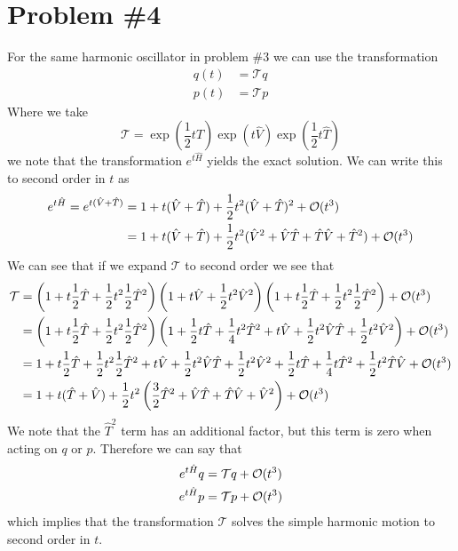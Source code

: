 \documentclass[11pt]{article}
\numberwithin{equation}{section}
\begin{document}
\pagebreak

\section{Problem \#4}
For the same harmonic oscillator in problem \#3 we can use the transformation
\begin{align*}
q(t) &= \mathcal{T}q\\
p(t) &= \mathcal{T}p
\end{align*}
Where we take
$$\mathcal{T} =  \exp\left(\frac{1}{2}t\hat{T}\right) \exp\left(t\hat{V}\right)\exp\left(\frac{1}{2}t\hat{T}\right)$$
we note that the transformation $e^{t\hat{H}}$ yields the exact solution. We can write this 
to second order in $t$ as
\begin{align*}
e^{t\hat{H}} = e^{t(\hat{V}+\hat{T})} &= 1 + t(\hat{V}+\hat{T}) + \frac{1}{2}t^2(\hat{V}+\hat{T})^2 + \mathcal{O}(t^3)\\ 
&= 1 + t(\hat{V}+\hat{T}) + \frac{1}{2}t^2(\hat{V}^2 + \hat{V}\hat{T} + \hat{T}\hat{V} +\hat{T}^2) + \mathcal{O}(t^3)\\ 
\end{align*}
We can see that if we expand $\mathcal{T}$ to second order we see that
\begin{align*}
\mathcal{T} &=  \left(1 + t\frac{1}{2}\hat{T} + \frac{1}{2}t^2\frac{1}{2}\hat{T}^2\right)\left(1 + t\hat{V} + \frac{1}{2}t^2\hat{V}^2\right)\left(1 + t\frac{1}{2}\hat{T} + \frac{1}{2}t^2\frac{1}{2}\hat{T}^2\right) + \mathcal{O}(t^3)\\
&=  \left(1 + t\frac{1}{2}\hat{T} + \frac{1}{2}t^2\frac{1}{2}\hat{T}^2\right)\left(1 + \frac{1}{2}t\hat{T} + \frac{1}{4}t^2\hat{T}^2 + t\hat{V} + \frac{1}{2}t^2\hat{V}\hat{T} + \frac{1}{2}t^2\hat{V}^2\right) + \mathcal{O}(t^3)\\
&=  1 + t\frac{1}{2}\hat{T} + \frac{1}{2}t^2\frac{1}{2}\hat{T}^2 + t\hat{V} + \frac{1}{2}t^2\hat{V}\hat{T} + \frac{1}{2}t^2\hat{V}^2 + \frac{1}{2}t\hat{T} + \frac{1}{4}t\hat{T}^2 + \frac{1}{2}t^2\hat{T}\hat{V} + \mathcal{O}(t^3)\\
&= 1 + t(\hat{T}+\hat{V}) + \frac{1}{2}t^2\left(\frac{3}{2}\hat{T}^2 + \hat{V}\hat{T} + \hat{T}\hat{V} + \hat{V}^2\right) + \mathcal{O}(t^3)
\end{align*}
We note that the $\hat{T}^2$ term has an additional factor, but this term is zero when acting
on $q$ or $p$. Therefore we can say that
\begin{align*}
e^{t\hat{H}}q &= \mathcal{T}q + \mathcal{O}(t^3)\\
e^{t\hat{H}}p &= \mathcal{T}p + \mathcal{O}(t^3)
\end{align*}
which implies that the transformation $\mathcal{T}$ solves the simple harmonic motion to 
second order in $t$.
\end{document}
